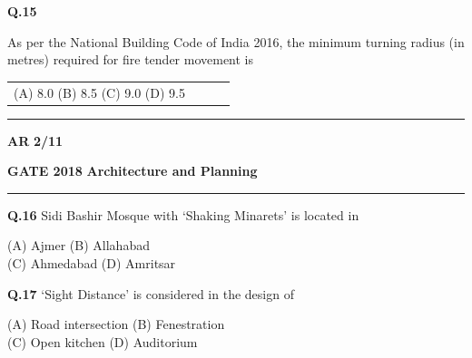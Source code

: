 \documentclass{article}
\begin{document}
\noindent \textbf{Q.15} \hspace{0.5cm} \parbox[t]{14cm}{ As per the National Building Code of India 2016, the minimum turning radius (in metres) required for fire tender movement is }

\vspace{0.6cm}
\begin{tabular}{llll}

     \hspace{1cm}  (A) 8.0 \hspace{3cm}  (B) 8.5 \hspace{3cm} (C) 9.0 \hspace{3cm}  (D) 9.5
     
\end{tabular}
\vspace{0.5cm}
\noindent
\hrule \vspace{0.0875CM} \textbf{AR} \hfill  \textbf{2/11}

 
 
\newpage


\noindent
\textbf{GATE 2018} \hfill \textbf{Architecture and Planning}
\vspace{0.0012cm} \hrule
 
\vspace{0.15cm}

\textbf{Q.16} \hspace{0.3cm} Sidi Bashir Mosque with ‘Shaking Minarets’ is located in

\begin{flushleft} 

\hspace{1.8cm}   (A) Ajmer \hspace{3.6cm}  (B) Allahabad \\
\hspace{1.8cm}   (C) Ahmedabad \hspace{2.7cm} (D) Amritsar 
\end{flushleft}

\vspace{0.5cm}

\textbf{Q.17} \hspace{0.3cm} ‘Sight Distance’ is considered in the design of

\begin{flushleft}
    

\hspace{1.8cm}(A) Road intersection \hspace{2.0455cm} (B) Fenestration \\
\hspace{1.8cm}(C) Open kitchen \hspace{2.7cm} (D) Auditorium 
\end{flushleft}
\end{document}

